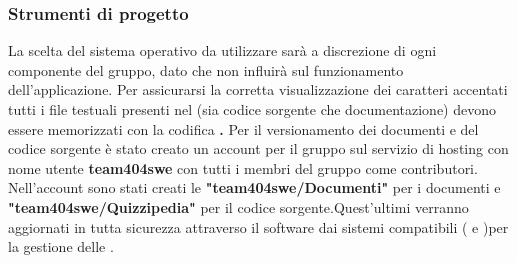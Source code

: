 \documentclass[a4paper,11pt]{article}
\begin{document}
		\subsubsection{Strumenti di progetto} \label{s:strum} 	
	
		La scelta del sistema operativo da utilizzare sarà a discrezione di ogni componente del gruppo, dato che non influirà sul funzionamento dell'applicazione.
		Per assicurarsi la corretta visualizzazione dei caratteri accentati tutti i file testuali presenti nel  (sia codice sorgente che documentazione) devono essere memorizzati con la codifica\textbf{ .}
		Per il versionamento dei documenti e del codice sorgente è stato creato un account per il gruppo sul servizio di hosting  con nome utente \textbf{team404swe} con tutti i membri del gruppo come contributori. Nell'account sono stati creati le  \textbf{"team404swe/Documenti"} per i documenti e \textbf{"team404swe/Quizzipedia"} per il codice sorgente.Quest'ultimi verranno aggiornati in tutta sicurezza attraverso  il software \textbf{} dai sistemi compatibili ( e )per la gestione delle  . 
				
\end{document}
